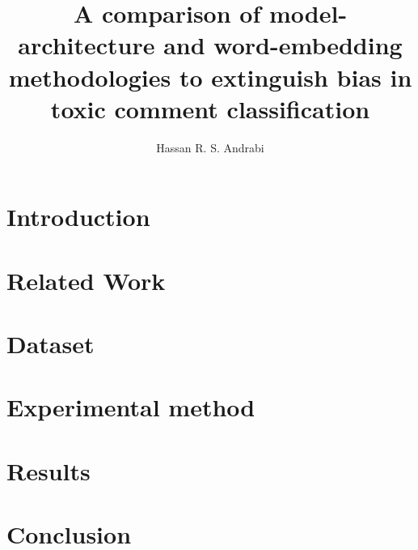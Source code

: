 \documentclass{article}
\title{A comparison of model-architecture and \linebreak word-embedding methodologies to extinguish \linebreak bias in toxic comment classification}
\author{Hassan R. S. Andrabi}
\date{}
\begin{document}
\maketitle

\begin{abstract}

\end{abstract}

\section{Introduction}\label{sec:introduction}


\section{Related Work}\label{sec:related-work}


\section{Dataset}\label{sec:dataset}


\section{Experimental method}\label{sec:experimental-method}


\section{Results}\label{sec:results}


\section{Conclusion}\label{sec:results}


\newpage



\end{document}
